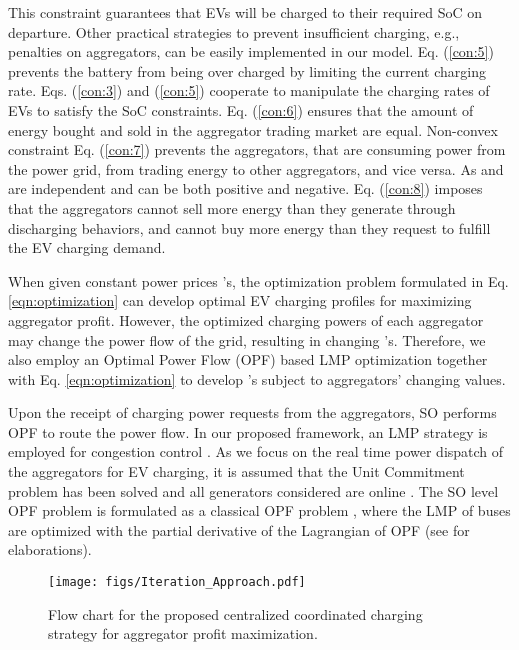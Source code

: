 \documentclass[conference]{IEEEtran}
\begin{document}
    This constraint guarantees that EVs will be charged to their required SoC on departure. Other practical strategies to prevent insufficient charging, e.g., penalties on aggregators, can be easily implemented in our model.
Eq. (\ref{con:5}) prevents the battery from being over charged by limiting the current charging rate.
Eqs. (\ref{con:3}) and (\ref{con:5}) cooperate to manipulate the charging rates of EVs to satisfy the SoC constraints.
Eq. (\ref{con:6}) ensures that the amount of energy bought and sold in the aggregator trading market are equal. Non-convex constraint Eq. (\ref{con:7}) prevents the aggregators, that are consuming power from the power grid, from trading energy to other aggregators, and vice versa. As  and  are independent and can be both positive and negative. Eq. (\ref{con:8}) imposes that the aggregators cannot sell more energy than they generate through discharging behaviors, and cannot buy more energy than they request to fulfill the EV charging demand. 
    
    When given constant power prices 's, the optimization problem formulated in Eq. \eqref{eqn:optimization} can develop optimal EV charging profiles for maximizing aggregator profit. However, the optimized charging powers of each aggregator  may change the power flow of the grid, resulting in changing 's. Therefore, we also employ an Optimal Power Flow (OPF) based LMP optimization together with Eq. \eqref{eqn:optimization} to develop 's subject to aggregators' changing  values.
	


	Upon the receipt of charging power requests from the aggregators, SO performs OPF to route the power flow. In our proposed framework, an LMP strategy is employed for congestion control \cite{Wang2014a}. As we focus on the real time power dispatch of the aggregators for EV charging, it is assumed that the Unit Commitment problem has been solved and all generators considered are online \cite{Yao2013}. The SO level OPF problem is formulated as a classical OPF problem \cite{Li2014},
where the LMP of buses are optimized with the partial derivative of the Lagrangian of OPF (see \cite{Li2014,Wang2014a} for elaborations).




	\begin{figure}
		\centering
		\texttt{[image: figs/Iteration\_Approach.pdf]}
        \vspace*{-3mm}
		\caption{Flow chart for the proposed centralized coordinated charging strategy for aggregator profit maximization.}
        \vspace*{-4mm}
		\label{fig:iteration_flowchart}
	\end{figure}
	
\end{document}
